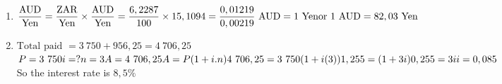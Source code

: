 \begin{solutions}{}
{\begin{enumerate}[itemsep=5pt, label=\textbf{\arabic*}. ]
\item $\dfrac{\text{AUD}}{\text{Yen}}=\dfrac{\text{ZAR}}{\text{Yen}} \times \dfrac{\text{AUD}}{\text{Yen}} \\[4pt]
= \dfrac{6,2287}{100} \times 15,1094 \\[4pt]
= \dfrac{0,01219}{0,00219} \text{ AUD} \\[4pt]
= 1 \text{ Yen} \\
\text{or } 1 \text{ AUD} = 82,03 \text{ Yen}$
\item $\text{Total paid } = 3~750 + 956,25 = 4~706,25$\\
$P=3~750\\
i=?\\
n=3\\
A=4~706,25\\
 A=P(1 + i . n) \\
4~706,25 = 3~750(1+ i(3))\\
1,255 = (1 + 3i)\\
0,255 = 3i \\
i = 0,085$\\
So the interest rate is $8,5 \%$
\end{enumerate}}
\end{solutions}


